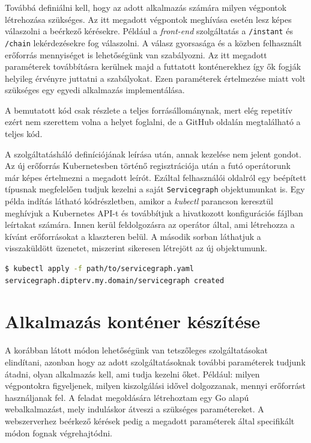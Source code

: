 Továbbá definiálni kell, hogy az adott alkalmazás számára milyen végpontok létrehozása szükséges. 
Az itt megadott végpontok meghívása esetén lesz képes válaszolni a beérkező kérésekre.
Például a \textit{front-end} szolgáltatás a \verb+/instant+ és \verb+/chain+ lekérdezésekre fog válaszolni. 
A válasz gyorsasága és a közben felhasznált erőforrás mennyiséget is lehetőségünk van szabályozni. 
Az itt megadott paraméterek továbbításra kerülnek majd a futtatott konténerekhez így ők fogják helyileg érvényre juttatni a szabályokat. 
Ezen paraméterek értelmezése miatt volt szükséges egy egyedi alkalmazás implementálása.

A bemutatott kód csak részlete a teljes forrásállománynak, mert elég repetitív ezért nem szerettem volna a helyet foglalni, de a GitHub oldalán megtalálható a teljes kód. \\

\lstset{caption=Saját szolgáltatásháló definiálása, label=servicegraph_example}


A szolgáltatásháló definíciójának leírása után, annak kezelése nem jelent gondot.
Az új erőforrás Kubernetesben történő regisztrációja után a futó operátorunk már képes értelmezni a megadott leírót.
Ezáltal felhasználói oldalról egy beépített típusnak megfelelően tudjuk kezelni a saját \verb+Servicegraph+ objektumunkat is.
Egy példa indítás látható  kódrészletben, amikor a \textit{kubectl} parancson keresztül meghívjuk a Kubernetes API-t és továbbítjuk a hivatkozott konfigurációs fájlban leírtakat számára.
Innen kerül feldolgozásra az operátor által, ami létrehozza a kívánt erőforrásokat a klaszteren belül. 
A második sorban láthatjuk a visszaküldött üzenetet, miszerint sikeresen létrejött az új objektumunk.\\

\lstset{caption=Szolgáltatásháló indítása, label=servicegraph_apply}
\begin{lstlisting}[language=bash,morekeywords={kubectl, apply},alsoletter={-},breaklines=true]
$ kubectl apply -f path/to/servicegraph.yaml                          
servicegraph.dipterv.my.domain/servicegraph created 
\end{lstlisting}


\section{Alkalmazás konténer készítése}
A korábban látott módon lehetőségünk van tetszőleges szolgáltatásokat elindítani, azonban hogy az adott szolgáltatásoknak további paraméterek tudjunk átadni, olyan alkalmazás kell, ami tudja kezelni őket. Például: milyen végpontokra figyeljenek, milyen kiszolgálási idővel dolgozzanak, mennyi erőforrást használjanak fel.
A feladat megoldására létrehoztam egy Go alapú webalkalmazást, mely induláskor átveszi a szükséges paramétereket. A webszerverhez beérkező kérések pedig a megadott paraméterek által specifikált módon fognak végrehajtódni. 

